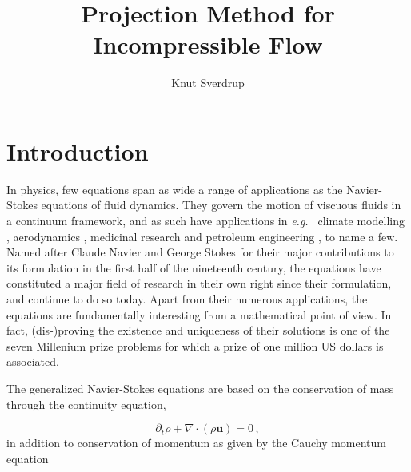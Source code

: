 \documentclass[final,3p,twocolumn]{elsarticle}
\begin{document}
\begin{frontmatter}

\title{Projection Method for Incompressible Flow}

\author{Knut Sverdrup}

\begin{abstract}
\end{abstract}

\end{frontmatter}

\section{Introduction}
\label{sec:introduction}

In physics, few equations span as wide a range of applications as the
Navier-Stokes equations of fluid dynamics. They govern the motion of viscuous
fluids in a continuum framework, and as such have applications in {\em e.g.\ }
climate modelling \cite{marshall1997finite, giraldo2008study}, aerodynamics
\cite{rai1987navier, thomas1990navier, jameson1998optimum}, medicinal research
\cite{peskin1977numerical, mihaescu2008large} and petroleum engineering
\cite{deiber1979flow, vinay2006numerical, cardenas2007navier, boyer2010cahn},
to name a few. Named after Claude Navier and George Stokes for their major
contributions \cite{navier1822memoire, stokes1845theories} to its formulation
in the first half of the nineteenth century, the equations have constituted a
major field of research in their own right since their formulation, and
continue to do so today. Apart from their numerous applications, the equations
are fundamentally interesting from a mathematical point of view. In fact,
(dis-)proving the existence and uniqueness of their solutions is one of the
seven Millenium prize problems \cite{fefferman2006existence} for which a prize
of one million US dollars is associated. 

The generalized Navier-Stokes equations are based on the conservation of mass
through the continuity equation,

\begin{equation}
    \partial_t \rho + \nabla \cdot (\rho {\bm u}) = 0 \,,
    \label{eq:continuity}
\end{equation}
%
in addition to conservation of momentum as given by the Cauchy momentum equation
\end{document}
